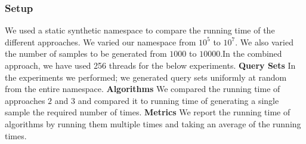 \documentclass[a4paper]{article}
\begin{document}
\subsubsection{Setup}
We used a static synthetic namespace to compare the running time of the different approaches. We varied our namespace from $10^5$ to $10^7$. We also varied the number of samples to be generated from $1000$ to $10000$.In the combined approach, we have used 256 threads for the below experiments. \newline
\textbf{Query Sets} In the experiments we performed; we generated query sets uniformly at random from the entire namespace.
\newline
\textbf{Algorithms} We compared the running time of approaches $2$ and $3$ and compared it to running time of generating a single sample the required number of times.
\newline
\textbf{Metrics} We report the running time of algorithms by running them multiple times and taking an average of the running times.
\end{document}
